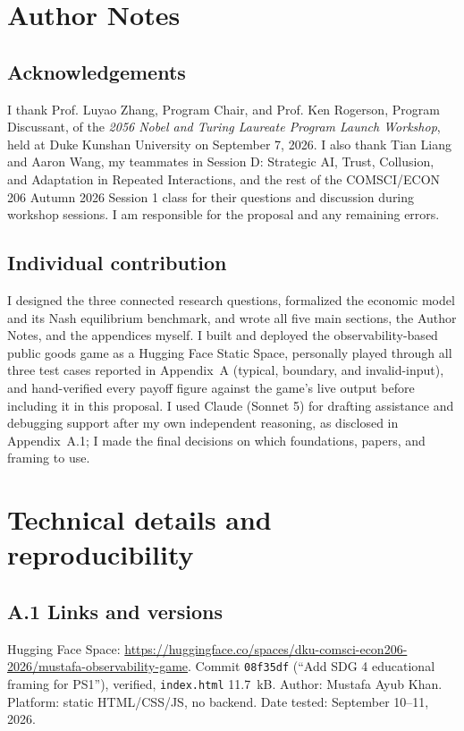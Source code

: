 \clearpage\nobalance
\section*{Author Notes}
\subsection*{Acknowledgements}
I thank Prof. Luyao Zhang, Program Chair, and Prof. Ken Rogerson, Program Discussant, of the \emph{2056 Nobel and Turing Laureate Program Launch Workshop}, held at Duke Kunshan University on September 7, 2026. I also thank Tian Liang and Aaron Wang, my teammates in Session D: Strategic AI, Trust, Collusion, and Adaptation in Repeated Interactions, and the rest of the COMSCI/ECON 206 Autumn 2026 Session 1 class for their questions and discussion during workshop sessions. I am responsible for the proposal and any remaining errors.

\subsection*{Individual contribution}
I designed the three connected research questions, formalized the economic model and its Nash equilibrium benchmark, and wrote all five main sections, the Author Notes, and the appendices myself. I built and deployed the observability-based public goods game as a Hugging Face Static Space, personally played through all three test cases reported in Appendix~A (typical, boundary, and invalid-input), and hand-verified every payoff figure against the game's live output before including it in this proposal. I used Claude (Sonnet 5) for drafting assistance and debugging support after my own independent reasoning, as disclosed in Appendix~A.1; I made the final decisions on which foundations, papers, and framing to use.


\appendix
\section{Technical details and reproducibility}
\subsection*{A.1 Links and versions}
Hugging Face Space: \url{https://huggingface.co/spaces/dku-comsci-econ206-2026/mustafa-observability-game}. Commit \texttt{08f35df} (``Add SDG 4 educational framing for PS1''), verified, \texttt{index.html} 11.7~kB. Author: Mustafa Ayub Khan. Platform: static HTML/CSS/JS, no backend. Date tested: September 10--11, 2026.

